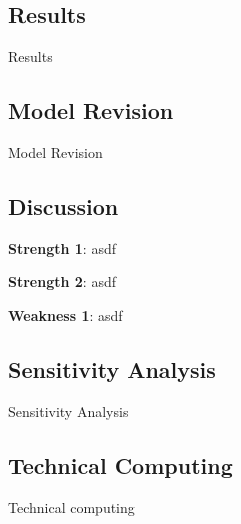 \subsection{Results}
Results

\subsection{Model Revision}
Model Revision

\subsection{Discussion}

\noindent\textbf{Strength 1}: asdf

\noindent\textbf{Strength 2}: asdf

\noindent\textbf{Weakness 1}: asdf

\subsection{Sensitivity Analysis}
Sensitivity Analysis

\subsection{Technical Computing}
Technical computing
